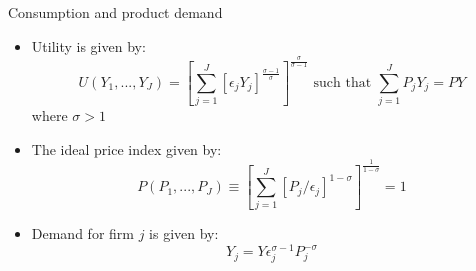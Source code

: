 \documentclass[aspectratio=169]{beamer}
\begin{document}
\begin{frame}{Consumption and product demand} \label{modelA}
\begin{itemize}
    \item Utility is given by:
    \begin{equation} \nonumber
    U(Y_{1},...,Y_{J})= \left[ \sum_{j=1}^{J} [ \epsilon_{j}Y_{j}]^{\frac{\sigma-1}{\sigma}} \right]^\frac{\sigma}{\sigma-1} \text{ such that } \sum_{j=1}^{J} P_{j}Y_{j} = P Y \label{eq_CES_utility}
    \end{equation}
    where $ \sigma >1$
    \item The ideal price index given by:
    \begin{equation} \nonumber
    P(P_{1},...,P_{J}) \equiv \left[ \sum_{j=1}^{J} [P_{j}/ \epsilon_{j}]^{1-\sigma} \right]^\frac{1}{1-\sigma} = 1 \label{eq_CES_ideal_price_index}
    \end{equation}
    \item Demand for firm $j$ is given by:
    \begin{equation} \nonumber
    Y_{j} = Y \epsilon_{j}^{\sigma - 1} P_{j}^{-\sigma} \label{eq_CES_demand}
    \end{equation}
\end{itemize}    
\end{frame}

\end{document}
